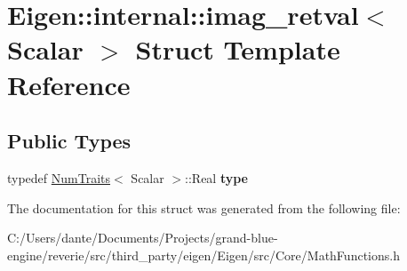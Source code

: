 \hypertarget{struct_eigen_1_1internal_1_1imag__retval}{}\section{Eigen\+::internal\+::imag\+\_\+retval$<$ Scalar $>$ Struct Template Reference}
\label{struct_eigen_1_1internal_1_1imag__retval}
\subsection*{Public Types}
\begin{DoxyCompactItemize}
\item 
\mbox{\label{struct_eigen_1_1internal_1_1imag__retval_adecabe221e4dd1fab9705da68d34cba7}} 
typedef \mbox{\hyperlink{struct_eigen_1_1_num_traits}{Num\+Traits}}$<$ Scalar $>$\+::Real {\bfseries type}
\end{DoxyCompactItemize}


The documentation for this struct was generated from the following file\+:\begin{DoxyCompactItemize}
\item 
C\+:/\+Users/dante/\+Documents/\+Projects/grand-\/blue-\/engine/reverie/src/third\+\_\+party/eigen/\+Eigen/src/\+Core/Math\+Functions.\+h\end{DoxyCompactItemize}
